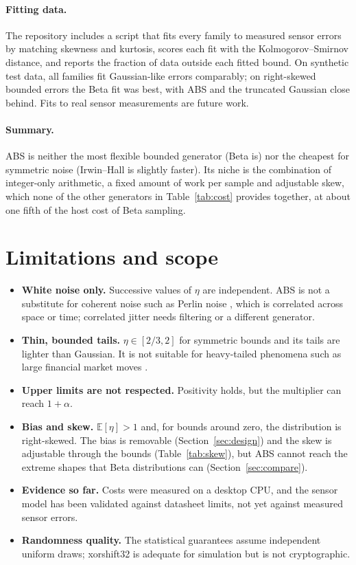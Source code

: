 \documentclass[10pt,a4paper]{article}
\theoremstyle{definition}
\theoremstyle{remark}
\newcommand{\E}{\mathbb{E}}
\begin{document}
\paragraph{Fitting data.} The repository includes a script that fits every family to measured
sensor errors by matching skewness and kurtosis, scores each fit with the Kolmogorov--Smirnov
distance, and reports the fraction of data outside each fitted bound. On synthetic test data,
all families fit Gaussian-like errors comparably; on right-skewed bounded errors the Beta fit
was best, with ABS and the truncated Gaussian close behind. Fits to real sensor measurements
are future work.

\paragraph{Summary.} ABS is neither the most flexible bounded generator (Beta is) nor the
cheapest for symmetric noise (Irwin--Hall is slightly faster). Its niche is the combination of
integer-only arithmetic, a fixed amount of work per sample and adjustable skew, which none of
the other generators in Table~\ref{tab:cost} provides together, at about one fifth of the host
cost of Beta sampling.

\section{Limitations and scope}\label{sec:limits}
\begin{itemize}
\item \textbf{White noise only.} Successive values of $\eta$ are independent. ABS is not a
substitute for coherent noise such as Perlin noise \cite{perlin}, which is correlated across
space or time; correlated jitter needs filtering or a different generator.
\item \textbf{Thin, bounded tails.} $\eta\in[2/3,2]$ for symmetric bounds and its tails are
lighter than Gaussian. It is not suitable for heavy-tailed phenomena such as large financial
market moves \cite{mandelbrot}.
\item \textbf{Upper limits are not respected.} Positivity holds, but the multiplier can reach
$1+\alpha$.
\item \textbf{Bias and skew.} $\E[\eta]>1$ and, for bounds around zero, the distribution is
right-skewed. The bias is removable (Section~\ref{sec:design}) and the skew is adjustable
through the bounds (Table~\ref{tab:skew}), but ABS cannot reach the extreme shapes that Beta
distributions can (Section~\ref{sec:compare}).
\item \textbf{Evidence so far.} Costs were measured on a desktop CPU, and the sensor model
has been validated against datasheet limits, not yet against measured sensor errors.
\item \textbf{Randomness quality.} The statistical guarantees assume independent uniform
draws; xorshift32 is adequate for simulation but is not cryptographic.
\end{itemize}
\end{document}
